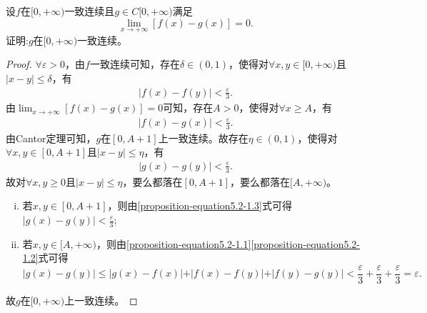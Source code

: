 \documentclass[../../main.tex]{subfiles}%
\begin{document}
\begin{proposition}\label{proposition:连续函数在无穷远处与一致连续极限相同则一定也一致连续}
设\(f\)在\([0,+\infty)\)一致连续且\(g\in C[0,+\infty)\)满足
\[
\lim_{x\rightarrow +\infty}[f(x)-g(x)] = 0.
\]
证明:\(g\)在\([0,+\infty)\)一致连续。
\end{proposition}
\begin{proof}

\(\forall \varepsilon > 0\)，由\(f\)一致连续可知，存在\(\delta \in (0, 1)\)，使得对\(\forall x, y \in [0, +\infty)\)且\(\vert x - y \vert \leqslant  \delta\)，有
\begin{align}\label{proposition-equation5.2-1.1}
\vert f(x) - f(y) \vert < \frac{\varepsilon}{3}. 
\end{align}
由\(\lim_{x \to +\infty}[f(x) - g(x)] = 0\)可知，存在\(A > 0\)，使得对\(\forall x \geqslant  A\)，有
\begin{align}\label{proposition-equation5.2-1.2}
\vert f(x) - g(x) \vert < \frac{\varepsilon}{3}.  
\end{align}
由Cantor定理可知，\(g\)在\([0, A + 1]\)上一致连续。故存在\(\eta \in (0, 1)\)，使得对\(\forall x, y \in [0, A + 1]\)且\(\vert x - y \vert \leqslant  \eta\)，有
\begin{align}\label{proposition-equation5.2-1.3}
\vert g(x) - g(y) \vert < \frac{\varepsilon}{3}. 
\end{align}
故对\(\forall x, y \geqslant  0\)且\(\vert x - y \vert \leqslant  \eta\)，要么都落在\([0, A + 1]\)，要么都落在\([A, +\infty)\)。
\begin{enumerate}[(i)]
\item 若\(x, y \in [0, A + 1]\)，则由\eqref{proposition-equation5.2-1.3}式可得\(\vert g(x) - g(y) \vert < \frac{\varepsilon}{3}\);
\item 若\(x, y \in [A, +\infty)\)，则由\eqref{proposition-equation5.2-1.1}\eqref{proposition-equation5.2-1.2}式可得
\[
\vert g(x) - g(y) \vert \leqslant  \vert g(x) - f(x) \vert + \vert f(x) - f(y) \vert + \vert f(y) - g(y) \vert < \frac{\varepsilon}{3} + \frac{\varepsilon}{3} + \frac{\varepsilon}{3} = \varepsilon.
\]
\end{enumerate}
故\(g\)在\([0, +\infty)\)上一致连续。

\end{proof}
\end{document}
